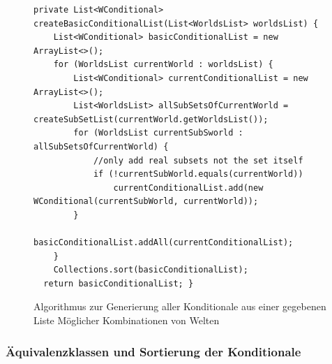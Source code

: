 \documentclass[12pt,a4paper]{article}
\begin{document}
\begin{figure}
\begin{lstlisting}
private List<WConditional> createBasicConditionalList(List<WorldsList> worldsList) {
    List<WConditional> basicConditionalList = new ArrayList<>();
    for (WorldsList currentWorld : worldsList) {
        List<WConditional> currentConditionalList = new ArrayList<>();
        List<WorldsList> allSubSetsOfCurrentWorld = createSubSetList(currentWorld.getWorldsList());
        for (WorldsList currentSubSworld : allSubSetsOfCurrentWorld) {
            //only add real subsets not the set itself
            if (!currentSubWorld.equals(currentWorld))
                currentConditionalList.add(new WConditional(currentSubWorld, currentWorld));
        }
        basicConditionalList.addAll(currentConditionalList);
    }
    Collections.sort(basicConditionalList);
  return basicConditionalList; }
\end{lstlisting}
\caption{Algorithmus zur Generierung aller Konditionale aus einer gegebenen Liste Möglicher Kombinationen von Welten}
\label{code:create-conditionals}
\end{figure} 


\subsubsection{Äquivalenzklassen und Sortierung der Konditionale}

\label{sec:equivalence}
\end{document}
